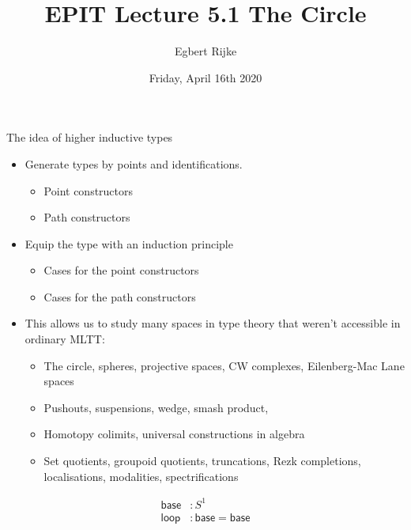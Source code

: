 \documentclass[handout]{beamer}
\title{EPIT Lecture 5.1 The Circle}
\author{Egbert Rijke}
\date{Friday, April 16th 2020}
\newcommand{\sphere}[1]{S^{#1}}
\newcommand{\baseS}{\mathsf{base}}
\newcommand{\loopS}{\mathsf{loop}}
\begin{document}
\begin{frame}
  \maketitle
\end{frame}

\begin{frame}
  The idea of higher inductive types
  \begin{itemize}
  \item Generate types by points and identifications.
    \begin{itemize}
    \item Point constructors
    \item Path constructors
    \end{itemize}\pause
  \item Equip the type with an induction principle
    \begin{itemize}
    \item Cases for the point constructors
    \item Cases for the path constructors
    \end{itemize}\pause 
  \item This allows us to study many spaces in type theory that weren't accessible in ordinary MLTT:
    \begin{itemize}
    \item The circle, spheres, projective spaces, CW complexes, Eilenberg-Mac Lane spaces
    \item Pushouts, suspensions, wedge, smash product, 
    \item Homotopy colimits, universal constructions in algebra
    \item Set quotients, groupoid quotients, truncations, Rezk completions, localisations, modalities, spectrifications
    \end{itemize}
  \end{itemize}
\end{frame}

\begin{frame}
  \begin{align*}
    \baseS & : \sphere{1} \\
    \loopS & : \baseS=\baseS
  \end{align*}
\end{frame}
\end{document}
